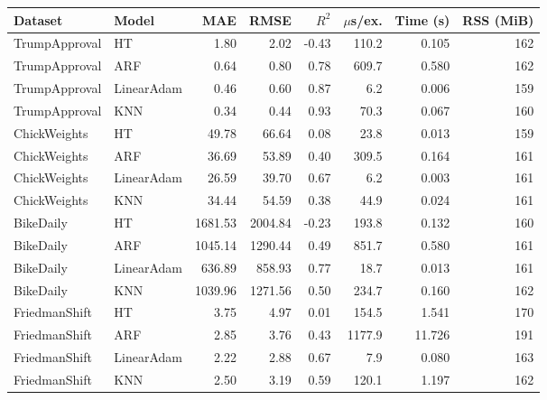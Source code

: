 \begin{tabular}{llrrrrrr}
\toprule
Dataset & Model & MAE & RMSE & $R^2$ & $\mu$s/ex. & Time (s) & RSS (MiB) \\
\midrule
TrumpApproval & HT & 1.80 & 2.02 & -0.43 & 110.2 & 0.105 & 162 \\
TrumpApproval & ARF & 0.64 & 0.80 & 0.78 & 609.7 & 0.580 & 162 \\
TrumpApproval & LinearAdam & 0.46 & 0.60 & 0.87 & 6.2 & 0.006 & 159 \\
TrumpApproval & KNN & 0.34 & 0.44 & 0.93 & 70.3 & 0.067 & 160 \\
ChickWeights & HT & 49.78 & 66.64 & 0.08 & 23.8 & 0.013 & 159 \\
ChickWeights & ARF & 36.69 & 53.89 & 0.40 & 309.5 & 0.164 & 161 \\
ChickWeights & LinearAdam & 26.59 & 39.70 & 0.67 & 6.2 & 0.003 & 161 \\
ChickWeights & KNN & 34.44 & 54.59 & 0.38 & 44.9 & 0.024 & 161 \\
BikeDaily & HT & 1681.53 & 2004.84 & -0.23 & 193.8 & 0.132 & 160 \\
BikeDaily & ARF & 1045.14 & 1290.44 & 0.49 & 851.7 & 0.580 & 161 \\
BikeDaily & LinearAdam & 636.89 & 858.93 & 0.77 & 18.7 & 0.013 & 161 \\
BikeDaily & KNN & 1039.96 & 1271.56 & 0.50 & 234.7 & 0.160 & 162 \\
FriedmanShift & HT & 3.75 & 4.97 & 0.01 & 154.5 & 1.541 & 170 \\
FriedmanShift & ARF & 2.85 & 3.76 & 0.43 & 1177.9 & 11.726 & 191 \\
FriedmanShift & LinearAdam & 2.22 & 2.88 & 0.67 & 7.9 & 0.080 & 163 \\
FriedmanShift & KNN & 2.50 & 3.19 & 0.59 & 120.1 & 1.197 & 162 \\
\bottomrule
\end{tabular}
